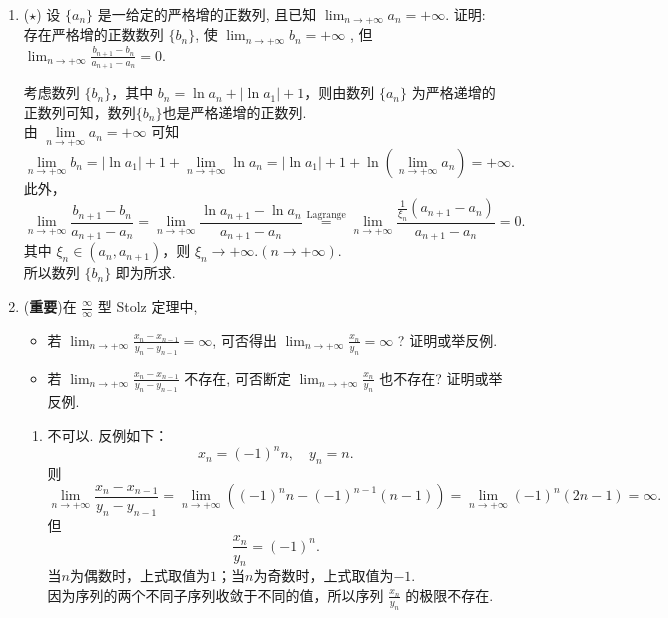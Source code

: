 \begin{enumerate}
    \item[12.]($\star$) 设 $\{a_{n}\}$ 是一给定的严格增的正数列, 且已知 $\displaystyle \lim_{n \to +\infty} a_{n} = +\infty$. 
    证明: 存在严格增的正数数列 $\{b_{n}\}$, 使 $\displaystyle\lim_{n \to +\infty} b_{n} = +\infty$ , 但 $\displaystyle\lim_{n \to +\infty} 
    \frac{b_{n+1} - b_{n}}{a_{n+1} - a_{n}} = 0$.
    
    \begin{solution}
        考虑数列 $\{b_{n}\}$，其中 $b_{n}=\ln{a_{n}}+\left|\ln{a_{1}}\right|+1$，则由数列 $\{a_{n}\}$ 为严格递增的正数列可知，数列$\{b_{n}\}$也是严格递增的正数列.\\
        由 $\underset{n\to+\infty}{\lim}a_{n}=+\infty$ 可知
        \[
        \lim_{n \to +\infty}b_{n}=\left|\ln{a_{1}}\right|+1+\lim_{n \to +\infty}\ln{a_{n}}
        =\left|\ln{a_{1}}\right|+1+\ln(\lim_{n \to +\infty}a_{n})=+\infty.
        \]
        此外，
        \[
        \lim_{n \to +\infty}\frac{b_{n+1}-b_{n}}{a_{n+1}-a_{n}}
        =\lim_{n \to +\infty} \frac{\ln{a_{n+1}}-\ln{a_{n}}}{a_{n+1}-a_{n}}
        \overset{\mathrm{Lagrange}}{=}\lim_{n \to +\infty}\frac{\frac{1}{\xi_{n}}(a_{n+1}-a_{n})}{a_{n+1}-a_{n}}=0.
        \]
        其中 $\xi_{n}\in(a_{n},a_{n+1})$，则 $\xi_{n}\to +\infty.(n\to+\infty)$.\\
        所以数列 $\{b_{n}\}$ 即为所求.
    \end{solution}

    \item[13.](\textbf{重要})在 $\displaystyle \frac{\infty}{\infty}$ 型 Stolz 定理中,
    \begin{itemize}
        \item[(a)]若 $\displaystyle\lim_{n \to +\infty} \frac{x_{n} - x_{n-1}}{y_{n} - y_{n-1}} = \infty$,
        可否得出 $\displaystyle\lim_{n \to +\infty} \frac{x_{n}}{y_{n}} = \infty$ ? 
        证明或举反例.
        \item[(b)]若 $\displaystyle\lim_{n \to +\infty} \frac{x_{n} - x_{n-1}}{y_{n} - y_{n-1}}$ 不存在, 
        可否断定 $\displaystyle\lim_{n \to +\infty} \frac{x_{n}}{y_{n}}$ 也不存在? 
        证明或举反例.
    \end{itemize}
    \begin{solution}
        \begin{enumerate}
            \item[(a)]不可以. 反例如下：
            \[
            x_{n}=(-1)^n n, \quad y_{n}=n.
            \]
            则
            \[
            \lim_{n \to +\infty}\frac{x_{n}-x_{n-1}}{y_{n}-y_{n-1}}
            =\lim_{n \to +\infty}((-1)^n n-(-1)^{n-1} (n-1))
            =\lim_{n \to +\infty}(-1)^n (2n-1)=\infty.
            \]
            但
            \[
            \frac{x_{n}}{y_{n}}=(-1)^n.
            \]
            当$n$为偶数时，上式取值为$1$；当$n$为奇数时，上式取值为$-1$.\\
            因为序列的两个不同子序列收敛于不同的值，所以序列 $\displaystyle\frac{x_{n}}{y_{n}}$ 的极限不存在.


\end{enumerate}
\end{solution}
\end{enumerate}
